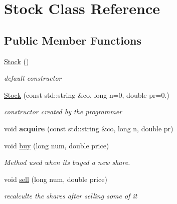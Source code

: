 \hypertarget{classStock}{}\section{Stock Class Reference}
\label{classStock}
\subsection*{Public Member Functions}
\begin{DoxyCompactItemize}
\item 
\mbox{\label{classStock_adddc4282213b3174a4299cca5a30117c}} 
\hyperlink{classStock_adddc4282213b3174a4299cca5a30117c}{Stock} ()
\begin{DoxyCompactList}\small\item\em default constructor \end{DoxyCompactList}\item 
\mbox{\label{classStock_accda2349e8588b08252571d73a053c78}} 
\hyperlink{classStock_accda2349e8588b08252571d73a053c78}{Stock} (const std\+::string \&co, long n=0, double pr=0.)
\begin{DoxyCompactList}\small\item\em constructor created by the programmer \end{DoxyCompactList}\item 
\mbox{\label{classStock_a5ec702d0afca0a14a051c60e323f5963}} 
void {\bfseries acquire} (const std\+::string \&co, long n, double pr)
\item 
\mbox{\label{classStock_acb2c8dffd2ccdcd5b4e9aba72006a188}} 
void \hyperlink{classStock_acb2c8dffd2ccdcd5b4e9aba72006a188}{buy} (long num, double price)
\begin{DoxyCompactList}\small\item\em Method used when its buyed a new share. \end{DoxyCompactList}\item 
\mbox{\label{classStock_ab19d8cd54ca77e4a5656a54da66df827}} 
void \hyperlink{classStock_ab19d8cd54ca77e4a5656a54da66df827}{sell} (long num, double price)
\begin{DoxyCompactList}\small\item\em recalculte the shares after selling some of it \end{DoxyCompactList}\item 

\end{DoxyCompactItemize}
